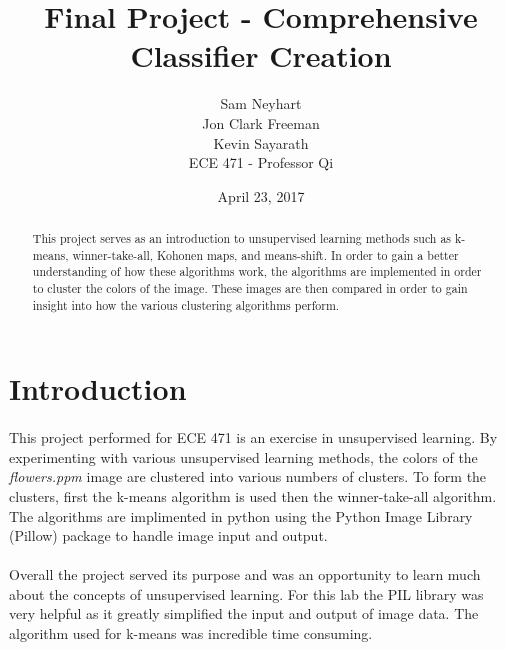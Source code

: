\documentclass{article}
\begin{document}
\title{Final Project - Comprehensive Classifier Creation}
\author{Sam Neyhart\\ Jon Clark Freeman\\ Kevin Sayarath\\ ECE 471 - Professor Qi}
\date{April 23, 2017}
\maketitle
\newpage


\begin{abstract}
This project serves as an introduction to unsupervised learning methods 
such as k-means, winner-take-all, Kohonen maps, and means-shift. In order
to gain a better understanding of how these algorithms work, the algorithms
are implemented in order to cluster the colors of the image. These images
are then compared in order to gain insight into how the various clustering
algorithms perform.
\end{abstract}
\newpage


\section*{Introduction}
\paragraph{}
This project performed for ECE 471 is an exercise in unsupervised learning.
By experimenting with various unsupervised learning methods, the colors
of the \textit{flowers.ppm} image are clustered into various numbers of clusters.
To form the clusters, first the k-means algorithm is used then the 
winner-take-all algorithm. The algorithms are implimented in python
using the Python Image Library (Pillow) package to handle image input and 
output.

\paragraph{} 
Overall the project served its purpose and was an opportunity to learn
much about the concepts of unsupervised learning. For this lab the 
PIL library was very helpful as it greatly simplified the input and output
of image data. The algorithm used for k-means was incredible time consuming.
\newpage
\end{document}
